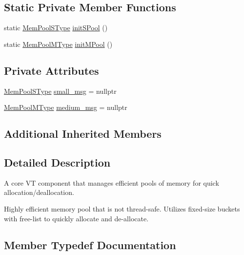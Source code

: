 \subsection*{Static Private Member Functions}
\begin{DoxyCompactItemize}
\item 
static \hyperlink{structvt_1_1pool_1_1_pool_a9f94985824d12c43357cfe50eaaefd38}{Mem\+Pool\+S\+Type} \hyperlink{structvt_1_1pool_1_1_pool_a833da3cd4d410ba607b6e7b000810882}{init\+S\+Pool} ()
\item 
static \hyperlink{structvt_1_1pool_1_1_pool_a8a201b9a843e47cd4e7b568a8e4483da}{Mem\+Pool\+M\+Type} \hyperlink{structvt_1_1pool_1_1_pool_ab768c364b348107112f960ce0704565d}{init\+M\+Pool} ()
\end{DoxyCompactItemize}
\subsection*{Private Attributes}
\begin{DoxyCompactItemize}
\item 
\hyperlink{structvt_1_1pool_1_1_pool_a9f94985824d12c43357cfe50eaaefd38}{Mem\+Pool\+S\+Type} \hyperlink{structvt_1_1pool_1_1_pool_a8f14f2f9b344882cf727200eb8d41845}{small\+\_\+msg} = nullptr
\item 
\hyperlink{structvt_1_1pool_1_1_pool_a8a201b9a843e47cd4e7b568a8e4483da}{Mem\+Pool\+M\+Type} \hyperlink{structvt_1_1pool_1_1_pool_a268cb9b30cde3272c49e67e781f0345e}{medium\+\_\+msg} = nullptr
\end{DoxyCompactItemize}
\subsection*{Additional Inherited Members}


\subsection{Detailed Description}
A core VT component that manages efficient pools of memory for quick allocation/deallocation. 

Highly efficient memory pool that is not thread-\/safe. Utilizes fixed-\/size buckets with free-\/list to quickly allocate and de-\/allocate. 

\subsection{Member Typedef Documentation}
\mbox{\label{structvt_1_1pool_1_1_pool_acc5ad2d64bf6ff58fead958a69c12d74}} 
